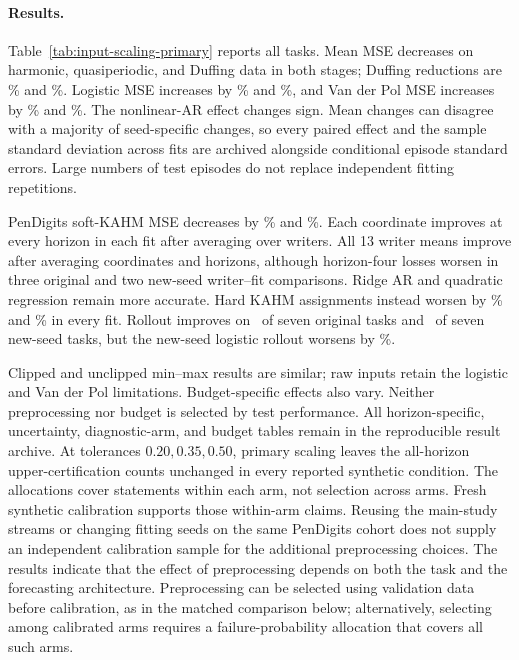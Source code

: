 

\paragraph{Results.}
Table~\ref{tab:input-scaling-primary} reports all tasks. Mean MSE decreases on
harmonic, quasiperiodic, and Duffing data in both stages; Duffing reductions
are \ScalingDuffingOriginalMagnitude\% and
\ScalingDuffingConfirmationMagnitude\%. Logistic MSE increases by
\ScalingLogisticOriginalMagnitude\% and
\ScalingLogisticConfirmationMagnitude\%, and Van der Pol MSE increases by
\ScalingVDPOriginalMagnitude\% and \ScalingVDPConfirmationMagnitude\%.
The nonlinear-AR effect changes sign. Mean changes can disagree with a majority
of seed-specific changes, so every paired effect and the sample standard
deviation across fits are archived alongside conditional episode standard
errors. Large numbers of test episodes do not replace independent fitting
repetitions.

PenDigits soft-KAHM MSE decreases by \ScalingPenOriginalMagnitude\% and
\ScalingPenConfirmationMagnitude\%. Each coordinate improves at every horizon
in each fit after averaging over writers. All 13 writer means improve after
averaging coordinates and horizons, although horizon-four losses worsen in
three original and two new-seed writer--fit comparisons. Ridge AR and
quadratic regression remain more accurate. Hard KAHM assignments instead worsen by
\ScalingHardPenOriginalIncrease\% and
\ScalingHardPenConfirmationIncrease\% in every fit. Rollout improves on
\ScalingRolloutOriginalImprovingTasks\ of seven original tasks and
\ScalingRolloutConfirmationImprovingTasks\ of seven new-seed tasks, but the
new-seed logistic rollout worsens by
\ScalingRolloutLogisticConfirmationMagnitude\%.

Clipped and unclipped min--max results are similar; raw inputs retain the
logistic and Van der Pol limitations. Budget-specific effects also vary.
Neither preprocessing nor budget is selected by test performance. All
horizon-specific, uncertainty, diagnostic-arm, and budget tables remain in the
reproducible result archive. At tolerances $0.20,0.35,0.50$, primary scaling
leaves the all-horizon upper-certification counts unchanged in every reported
synthetic condition. The allocations cover statements within each arm, not
selection across arms. Fresh synthetic calibration supports those within-arm
claims. Reusing the
main-study streams or changing fitting seeds on the same PenDigits cohort
does not supply an independent calibration sample for the additional
preprocessing choices. The results indicate that the effect of preprocessing
depends on both the task and the forecasting architecture. Preprocessing can
be selected using validation data before calibration, as in the matched
comparison below; alternatively, selecting among calibrated arms requires a
failure-probability allocation that covers all such arms.
